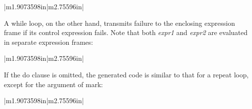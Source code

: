 \begin{center}
\tablelasttail{\hline}
\begin{xtabular}{|m{1.9073598in}|m{2.75596in}|}

\end{xtabular}
\end{center}

A while loop, on the other hand, transmits failure to the enclosing
expression frame if its control expression fails. Note that both
\textit{expr1} and \textit{expr2} are evaluated in separate expression
frames:

\begin{center}
\tablelasttail{\hline}
\begin{xtabular}{|m{1.9073598in}|m{2.75596in}|}

\end{xtabular}
\end{center}

If the do clause is omitted, the generated code is similar to that for
a repeat loop, except for the argument of mark:

\begin{center}
\tablelasttail{\hline}
\begin{xtabular}{|m{1.9073598in}|m{2.75596in}|}

\end{xtabular}
\end{center}

